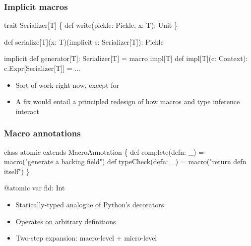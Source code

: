 \documentclass[svgnames,hyperref={bookmarks=false}]{beamer}
\begin{document}
\begin{frame}[fragile]
\frametitle{Implicit macros}
\begin{semiverbatim}
trait Serializer[T] \{
  def write(pickle: Pickle, x: T): Unit
\}

def serialize[T](x: T)(implicit s: Serializer[T]): Pickle

implicit def generator[T]: Serializer[T] = macro impl[T]
def impl[T](c: Context): c.Expr[Serializer[T]] = ...

\end{semiverbatim}

\begin{itemize}
\item Sort of work right now, except for 
\item A fix would entail a principled redesign of how macros and type inference interact 
\end{itemize}
\end{frame}

\begin{frame}[fragile]
\frametitle{Macro annotations}
\begin{semiverbatim}
class atomic extends MacroAnnotation \{
  def complete(defn: _) = macro("generate a backing field")
  def typeCheck(defn: _) = macro("return defn itself")
\}

@atomic var fld: Int

\end{semiverbatim}

\begin{itemize}
\item Statically-typed analogue of Python's decorators
\item Operates on arbitrary definitions
\item Two-step expansion: macro-level + micro-level
\end{itemize}
\end{frame}
\end{document}
